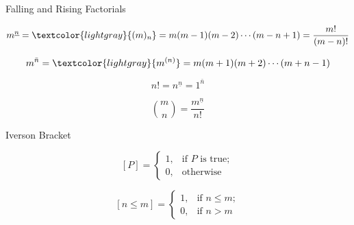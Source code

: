
\begin{frame}{}
  \begin{center}
    Falling and Rising Factorials
  \end{center}

  \[
    m^{\underline{n}} = \textcolor{lightgray}{(m)_{n}} 
    = m (m-1) (m-2) \cdots (m-n+1) = \frac{m!}{(m-n)!}
  \]

  \pause
  \[
    m^{\bar{n}} = \textcolor{lightgray}{m^{(n)}} 
    = m (m+1) (m+2) \cdots (m+n-1) 
  \]

  \pause
  \[
    n! = n^{\underline{n}} = 1^{\bar{n}}
  \]

  \pause
  \[
    {m \choose n} = \frac{m^{\underline{n}}}{n!}
  \]
\end{frame}

\begin{frame}{}
  \begin{center}
    Iverson Bracket
  \end{center}

  \[
    [P] = \begin{cases}
            1, & \text{if $P$ is true}; \\
            0, & \text{otherwise}
          \end{cases}
  \]

  \pause
  \[
    [n \le m] = \begin{cases}
                  1, & \text{if } n \le m; \\
                  0, & \text{if } n > m
                \end{cases}
  \]
\end{frame}
